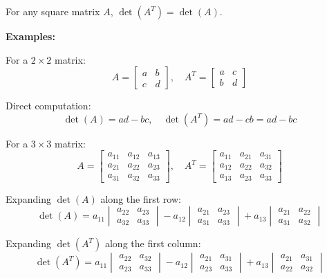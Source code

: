 \begin{tcolorbox}[colback=white,colframe=black,title=Theorem]
For any square matrix $A$, $\det(A^T) = \det(A)$.
\end{tcolorbox}

\textbf{Examples:}

For a $2 \times 2$ matrix:
$$A = \begin{bmatrix} a & b \\ c & d \end{bmatrix}, \quad A^T = \begin{bmatrix} a & c \\ b & d \end{bmatrix}$$

Direct computation:
$$\det(A) = ad - bc, \quad \det(A^T) = ad - cb = ad - bc$$

For a $3 \times 3$ matrix:
$$A = \begin{bmatrix} a_{11} & a_{12} & a_{13} \\ a_{21} & a_{22} & a_{23} \\ a_{31} & a_{32} & a_{33} \end{bmatrix}, \quad A^T = \begin{bmatrix} a_{11} & a_{21} & a_{31} \\ a_{12} & a_{22} & a_{32} \\ a_{13} & a_{23} & a_{33} \end{bmatrix}$$

Expanding $\det(A)$ along the first row:
$$\det(A) = a_{11}\begin{vmatrix} a_{22} & a_{23} \\ a_{32} & a_{33} \end{vmatrix} - a_{12}\begin{vmatrix} a_{21} & a_{23} \\ a_{31} & a_{33} \end{vmatrix} + a_{13}\begin{vmatrix} a_{21} & a_{22} \\ a_{31} & a_{32} \end{vmatrix}$$

Expanding $\det(A^T)$ along the first column:
$$\det(A^T) = a_{11}\begin{vmatrix} a_{22} & a_{32} \\ a_{23} & a_{33} \end{vmatrix} - a_{12}\begin{vmatrix} a_{21} & a_{31} \\ a_{23} & a_{33} \end{vmatrix} + a_{13}\begin{vmatrix} a_{21} & a_{31} \\ a_{22} & a_{32} \end{vmatrix}$$

